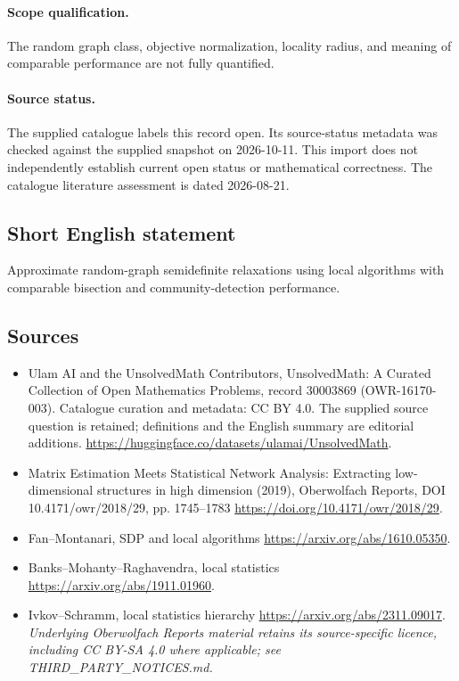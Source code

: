 \documentclass[11pt]{article}
\begin{document}
\paragraph{Scope qualification.}
The random graph class, objective normalization, locality radius, and meaning of comparable performance are not fully quantified.
\paragraph{Source status.}
The supplied catalogue labels this record open. Its source-status metadata was checked against the supplied snapshot on 2026-10-11. This import does not independently establish current open status or mathematical correctness. The catalogue literature assessment is dated 2026-08-21.
\subsection{Short English statement}
Approximate random-graph semidefinite relaxations using local algorithms with comparable bisection and community-detection performance.
\subsection{Sources}
\begin{itemize}
\item[S1] Ulam AI and the UnsolvedMath Contributors, UnsolvedMath: A Curated Collection of Open Mathematics Problems, record 30003869 (OWR-16170-003). Catalogue curation and metadata: CC BY 4.0. The supplied source question is retained; definitions and the English summary are editorial additions.
\url{https://huggingface.co/datasets/ulamai/UnsolvedMath}.
\item[S2] Matrix Estimation Meets Statistical Network Analysis: Extracting low-dimensional structures in high dimension (2019), Oberwolfach Reports, DOI 10.4171/owr/2018/29, pp. 1745--1783
\url{https://doi.org/10.4171/owr/2018/29}.
\item[S3] Fan--Montanari, SDP and local algorithms
\url{https://arxiv.org/abs/1610.05350}.
\item[S4] Banks--Mohanty--Raghavendra, local statistics
\url{https://arxiv.org/abs/1911.01960}.
\item[S5] Ivkov--Schramm, local statistics hierarchy
\url{https://arxiv.org/abs/2311.09017}.
\textit{Underlying Oberwolfach Reports material retains its source-specific licence, including CC BY-SA 4.0 where applicable; see THIRD\_PARTY\_NOTICES.md.}
\end{itemize}
\end{document}

